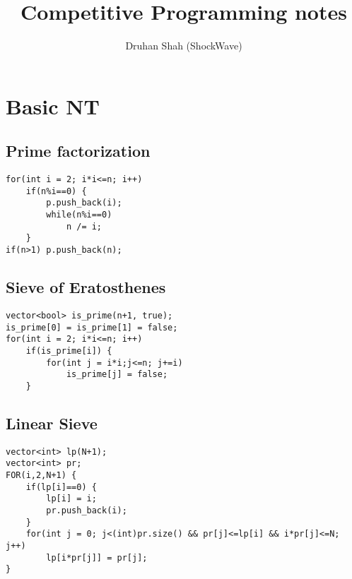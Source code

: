 \documentclass{article}
\author{Druhan Shah (ShockWave)}
\title{Competitive Programming notes}
\begin{document}
    \maketitle
    \tableofcontents

	
    \section{Basic NT}
        \subsection{Prime factorization}

        \begin{lstlisting}
for(int i = 2; i*i<=n; i++)
    if(n%i==0) {
        p.push_back(i);
        while(n%i==0)
            n /= i;
    }
if(n>1) p.push_back(n);   \end{lstlisting}


        \subsection{Sieve of Eratosthenes}

        \begin{lstlisting}
vector<bool> is_prime(n+1, true);
is_prime[0] = is_prime[1] = false;
for(int i = 2; i*i<=n; i++)
    if(is_prime[i]) {
        for(int j = i*i;j<=n; j+=i)
            is_prime[j] = false;
    }   \end{lstlisting}

        \subsection{Linear Sieve}
        

        \begin{lstlisting}
vector<int> lp(N+1);
vector<int> pr;
FOR(i,2,N+1) {
    if(lp[i]==0) {
        lp[i] = i;
        pr.push_back(i);
    }
    for(int j = 0; j<(int)pr.size() && pr[j]<=lp[i] && i*pr[j]<=N; j++)
        lp[i*pr[j]] = pr[j];
}       \end{lstlisting}
\end{document}
